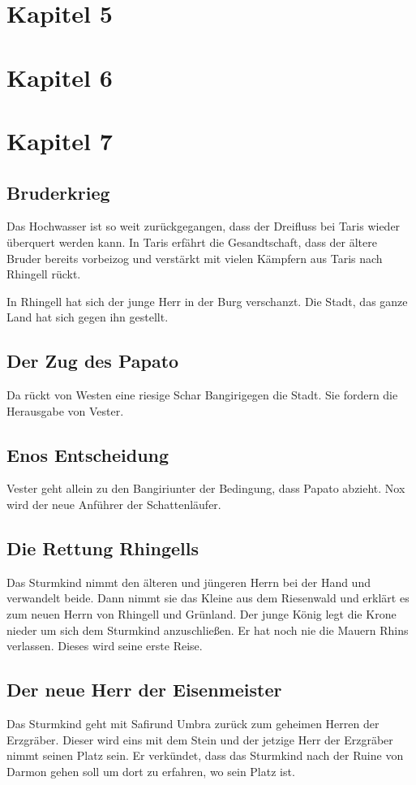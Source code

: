 \documentclass[12pt,a4paper,onecolumn,twoside,ngerman]{book}
\newcommand{\Bangiri}{Bangiri}
\newcommand{\Eno}{Eno}
\newcommand{\Rhin}{Rhin}
\newcommand{\Safir}{Safir}
\begin{document}
\chapter{Kapitel 5}

\chapter{Kapitel 6}

\chapter{Kapitel 7}
\section{Bruderkrieg}
Das Hochwasser ist so weit zurückgegangen, dass der Dreifluss bei Taris wieder überquert werden kann. In Taris erfährt die Gesandtschaft, dass der ältere Bruder bereits vorbeizog und verstärkt mit vielen Kämpfern aus Taris nach Rhingell rückt. 

In Rhingell hat sich der junge Herr in der Burg verschanzt. Die Stadt, das ganze Land hat sich gegen ihn gestellt. 

\section{Der Zug des Papato}
Da rückt von Westen eine riesige Schar \Bangiri gegen die Stadt. Sie fordern die Herausgabe von Vester.

\section{{\Eno}s Entscheidung}
Vester geht allein zu den \Bangiri unter der Bedingung, dass Papato abzieht. Nox wird der neue Anführer der Schattenläufer.

\section{Die Rettung Rhingells}
Das Sturmkind nimmt den älteren und jüngeren Herrn bei der Hand und verwandelt beide. Dann nimmt sie das Kleine aus dem Riesenwald und erklärt es zum neuen Herrn von Rhingell und Grünland. Der junge König legt die Krone nieder um sich dem Sturmkind anzuschließen. Er hat noch nie die Mauern \Rhin{s} verlassen. Dieses wird seine erste Reise.

\section{Der neue Herr der Eisenmeister}
Das Sturmkind geht mit \Safir und Umbra zurück zum geheimen Herren der Erzgräber. Dieser wird eins mit dem Stein und der jetzige Herr der Erzgräber nimmt seinen Platz sein. Er verkündet, dass das Sturmkind nach der Ruine von Darmon gehen soll um dort zu erfahren, wo sein Platz ist.
\end{document}
